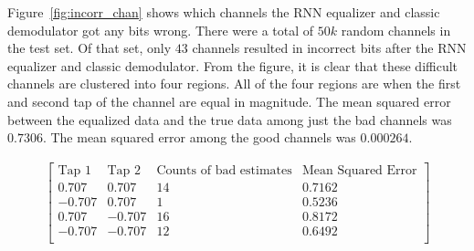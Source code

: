 Figure~\ref{fig:incorr_chan} shows which channels the RNN equalizer and classic demodulator got any bits wrong.  
There were a total of $50k$ random channels in the test set.  
Of that set, only $43$ channels resulted in incorrect bits after the RNN equalizer and classic demodulator.
From the figure, it is clear that these difficult channels are clustered into four regions. All of the four regions are when the first and second tap of the channel are equal in magnitude.
The mean squared error between the equalized data and the true data among just the bad channels was $0.7306$.  The mean squared error among the good channels was $0.000264$.

\begin{align*}
\begin{bmatrix}
\text{Tap 1} & \text{Tap 2} & \text{Counts of bad estimates} & \text{Mean Squared Error}\\
\hline
0.707 & 0.707 & 14 & 0.7162\\
-0.707 & 0.707 & 1 & 0.5236\\
0.707 & -0.707 & 16 & 0.8172\\
-0.707 & -0.707 & 12 & 0.6492\\
\end{bmatrix}
\end{align*}


